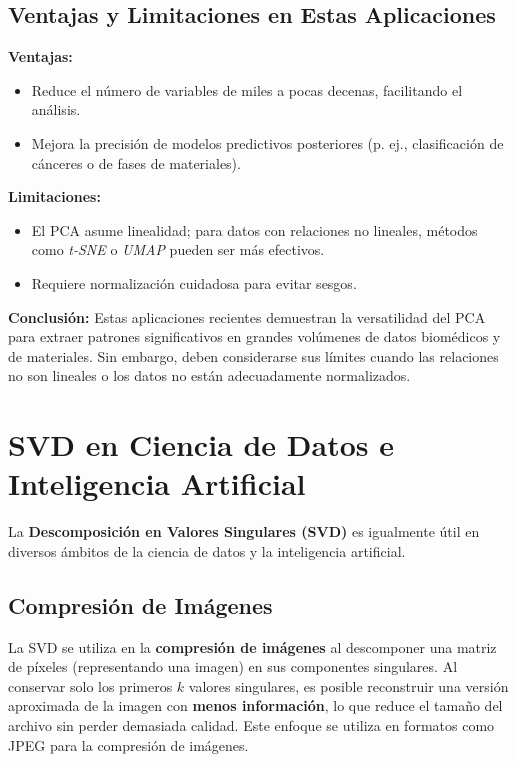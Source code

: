 \documentclass[12pt]{article}
\begin{document}
        \subsection*{Ventajas y Limitaciones en Estas Aplicaciones}
        \textbf{Ventajas:}
        \begin{itemize}
                \item Reduce el número de variables de miles a pocas decenas, facilitando el análisis.
                \item Mejora la precisión de modelos predictivos posteriores (p. ej., clasificación de cánceres o de fases de materiales).
        \end{itemize}
        
        \textbf{Limitaciones:}
        \begin{itemize}
                \item El PCA asume linealidad; para datos con relaciones no lineales, métodos como \emph{t-SNE} o \emph{UMAP} pueden ser más efectivos.
                \item Requiere normalización cuidadosa para evitar sesgos.
        \end{itemize}
        
        \vspace{1em}
        \noindent
        \textbf{Conclusión:} Estas aplicaciones recientes demuestran la versatilidad del PCA para extraer patrones significativos en grandes volúmenes de datos biomédicos y de materiales. Sin embargo, deben considerarse sus límites cuando las relaciones no son lineales o los datos no están adecuadamente normalizados.
        
        \section*{SVD en Ciencia de Datos e Inteligencia Artificial}
        \noindent
        La \textbf{Descomposición en Valores Singulares (SVD)} es igualmente útil en diversos ámbitos de la ciencia de datos y la inteligencia artificial.
        
        \subsection*{Compresión de Imágenes}
        \noindent
        La SVD se utiliza en la \textbf{compresión de imágenes} al descomponer una matriz de píxeles (representando una imagen) en sus componentes singulares. Al conservar solo los primeros $k$ valores singulares, es posible reconstruir una versión aproximada de la imagen con \textbf{menos información}, lo que reduce el tamaño del archivo sin perder demasiada calidad. Este enfoque se utiliza en formatos como JPEG para la compresión de imágenes.
        
\end{document}
